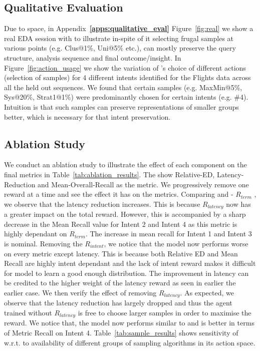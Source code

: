  



\vspace{-0.2em}
\subsection{Qualitative Evaluation}
\vspace{-0.2em}
%
Due to space, in Appendix~\textbf{\ref{apps:qualitative_eval}} Figure~\ref{fig:real} we show a real EDA session with \name to illustrate in-spite of it selecting frugal samples at various points (e.g. Clus@1\%, Uni@5\% etc.), \name can mostly preserve the query structure, analysis sequence and final outcome/insight. 
In Figure~\ref{fig:action_usage} we show the variation of \name's choice of different actions (selection of samples) for 4 different intents identified for the Flights data across all the held out sequences.
We found that certain samples (e.g. MaxMin@5\%, Sys@20\%, Strat1@1\%) were predominantly chosen for certain intents (e.g. \#4). Intuition is that such samples can preserve representations of smaller groups better, which is necessary for that intent preservation.

\subsection{Ablation Study}
%
We conduct an ablation study to illustrate the effect of each component on the final metrics in Table~\ref{tab:ablation_results}.
The show Relative-ED, Latency-Reduction and Mean-Overall-Recall as the metric. We progressively remove one reward at a time and see the effect it has on the metrics. Comparing \name and \name - $R_{term}$ , we observe that the latency reduction increases. This is because $R_{latency}$ now has a greater impact on the total reward. However, this is accompanied by a sharp decrease in the Mean Recall value for Intent 2 and Intent 4 as this metric is highly dependant on $R_{term}$. The increase in mean recall for Intent 1 and Intent 3 is nominal.
%
Removing the $R_{intent}$, we notice that the model now performs worse on every metric except latency. This is because both Relative ED and Mean Recall are highly intent dependant and the lack of intent reward makes it difficult for model to learn a good enough distribution. The improvement in latency can be credited to the higher weight of the latency reward as seen in earlier the earlier case. 
%
We then verify the effect of removing $R_{latency}$. As expected, we observe that the latency reduction has largely dropped and thus the agent trained without $R_{latency}$ is free to choose larger samples in order to maximise the reward. We notice that, the model now  performs similar to \name and is better in terms of Metric Recall on Intent 4.
Table~\ref{tab:sample_results} shows sensitivity of \name w.r.t. to availability of different groups of sampling algorithms in its action space.

